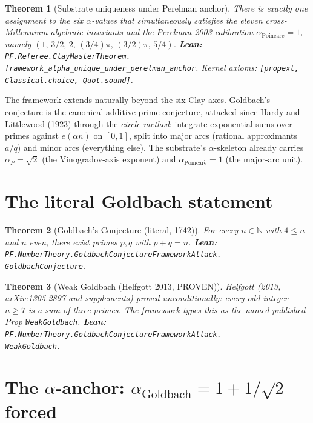 \documentclass[11pt,a4paper]{article}
\theoremstyle{plain}
\newtheorem{theorem}{Theorem}[section]
\theoremstyle{definition}
\begin{document}
\begin{theorem}[Substrate uniqueness under Perelman anchor]
\label{thm:substrate-unique}
There is exactly one assignment to the six $\alpha$-values that
simultaneously satisfies the eleven cross-Millennium algebraic
invariants and the Perelman 2003 calibration
$\alpha_{\mathrm{Poincar\acute e}} = 1$, namely
$(1,\, 3/2,\, 2,\, (3/4)\pi,\, (3/2)\pi,\, 5/4)$.
\textbf{Lean:}
\texttt{PF.Referee.ClayMasterTheorem.\\
framework\_alpha\_unique\_under\_perelman\_anchor}.
Kernel axioms: \texttt{[propext, Classical.choice, Quot.sound]}.
\end{theorem}

The framework extends naturally beyond the six Clay axes. Goldbach's
conjecture is the canonical additive prime conjecture, attacked since
Hardy and Littlewood (1923) through the \emph{circle method}: integrate
exponential sums over primes against $e(\alpha n)$ on $[0, 1]$, split
into major arcs (rational approximants $a / q$) and minor arcs
(everything else). The substrate's $\alpha$-skeleton already carries
$\alpha_{P} = \sqrt{2}$ (the Vinogradov-axis exponent) and
$\alpha_{\mathrm{Poincar\acute e}} = 1$ (the major-arc unit).

\section{The literal Goldbach statement}
\label{sec:literal}

\begin{theorem}[Goldbach's Conjecture (literal, 1742)]
\label{thm:goldbach-literal}
For every $n \in \mathbb{N}$ with $4 \le n$ and $n$ even, there exist
primes $p, q$ with $p + q = n$.
\textbf{Lean:}
\texttt{PF.NumberTheory.GoldbachConjectureFrameworkAttack.\\
GoldbachConjecture}.
\end{theorem}

\begin{theorem}[Weak Goldbach (Helfgott 2013, PROVEN)]
\label{thm:weak-goldbach}
Helfgott (2013, arXiv:1305.2897 and supplements) proved
unconditionally: every odd integer $n \ge 7$ is a sum of three primes.
The framework types this as the named published Prop
\texttt{WeakGoldbach}.
\textbf{Lean:}
\texttt{PF.NumberTheory.GoldbachConjectureFrameworkAttack.\\
WeakGoldbach}.
\end{theorem}

\section{The $\alpha$-anchor: $\alpha_{\mathrm{Goldbach}} = 1 + 1/\sqrt{2}$ forced}
\label{sec:alpha}
\end{document}
